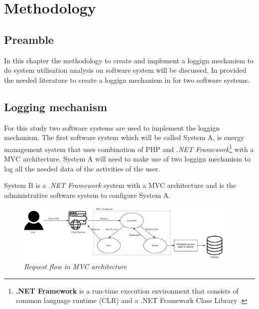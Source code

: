 \chapter{Methodology}
\label{chap:2}

\section{Preamble}
In this chapter the methodology to create and implement a loggign mechanism to do system utilisation analysis on software system will be discussed. In  provided the needed literature to create a loggign mechanism in  for two software systems.

\section{Logging mechanism}\label{sec:Ch3_LoggingMechanism}
For this study two software systems are used to implement the loggign mechanism. The first software system which will be called System A, is energy management system that uses combination of PHP and \textit{.NET Framework}\footnote{\label{ftn:NetFramework}\textbf{.NET Framework} is a run-time execution environment that consists of common language runtime (CLR) and a .NET Framework Class Library \cite{Harkness2007}.} with a MVC architecture. System A will need to make use of two loggign mechanism to log all the needed data of the activities of the user.\par System B is a \textit{.NET Framework} system with a MVC architecture and is the administrative software system to configure System A.

\begin{figure}[!htb] %
	\centering %
	\includegraphics[width=0.95\textwidth]{Images/Chapter2/Flow_MVC_Architecture/Flow_MVC_Architecture.pdf}
	\caption[Request flow in MVC architecture]
	{\textit{Request flow in MVC architecture \cite{Gu2010}}}\label{fig:Flow_MVC_Architecture}
\end{figure}

